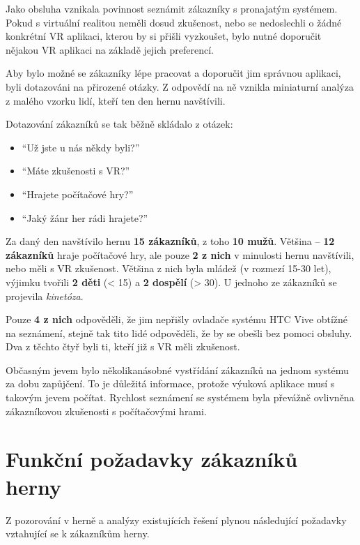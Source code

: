Jako obsluha vznikala povinnost seznámit zákazníky s pronajatým
systémem. Pokud s virtuální realitou neměli dosud zkušenost, nebo se
nedoslechli o žádné konkrétní VR aplikaci, kterou by si přišli
vyzkoušet, bylo nutné doporučit nějakou VR aplikaci na základě jejich
preferencí.

Aby bylo možné se zákazníky lépe pracovat a doporučit jim správnou
aplikaci, byli dotazováni na přirozené otázky. Z odpovědí na ně vznikla
miniaturní analýza z malého vzorku lidí, kteří ten den hernu navštívili.

Dotazování zákazníků se tak běžně skládalo z otázek: 

\begin{itemize}
\tightlist
\item
``Už jste u nás
někdy byli?''
\item
  ``Máte zkušenosti s VR?''
\item
  ``Hrajete počítačové hry?''
\item
  ``Jaký žánr her rádi hrajete?''
\end{itemize}

Za daný den navštívilo hernu \textbf{15 zákazníků}, z toho \textbf{10
mužů}. Většina -- \textbf{12 zákazníků} hraje počítačové hry, ale pouze
\textbf{2 z nich} v minulosti hernu navštívili, nebo měli s VR
zkušenost. Většina z nich byla mládež (v rozmezí 15-30 let), výjimku
tvořili \textbf{2 děti} (\textless{} 15) a \textbf{2 dospělí}
(\textgreater{} 30). U jednoho ze zákazníků se projevila
\emph{kinetóza}.

Pouze \textbf{4 z nich} odpověděli, že jim nepřišly ovladače systému HTC
Vive obtížné na seznámení, stejně tak tito lidé odpověděli, že by se
obešli bez pomoci obsluhy. Dva z těchto čtyř byli ti, kteří již s VR
měli zkušenost.

Občasným jevem bylo několikanásobné vystřídání zákazníků na jednom
systému za dobu zapůjčení. To je důležitá informace, protože výuková
aplikace musí s takovým jevem počítat. Rychlost seznámení se systémem
byla převážně ovlivněna zákazníkovou zkušenosti s počítačovými hrami.

\section{Funkční požadavky zákazníků
herny}\label{funkux10dnuxed-poux17eadavky-zakazniku-herny}

Z pozorování v herně a analýzy existujících řešení plynou následující
požadavky vztahující se k zákazníkům herny.

